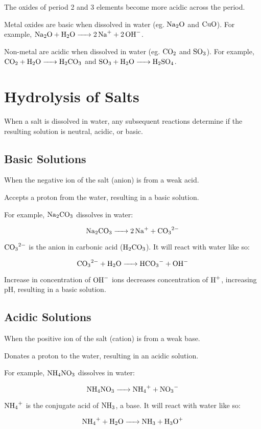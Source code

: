 \documentclass[a4paper,11pt]{article}
\begin{document}
The oxides of period 2 and 3 elements become more acidic across the period.

Metal oxides are basic when dissolved in water (eg. $\ce{Na2O}$ and $\ce{CuO}$).
For example, $\ce{Na2O + H2O -> 2Na+ + 2OH-}$.

Non-metal are acidic when dissolved in water (eg. $\ce{CO2}$ and $\ce{SO3}$).
For example, $\ce{CO2 + H2O -> H2CO3}$ and $\ce{SO3 + H2O -> H2SO4}$.


\section{Hydrolysis of Salts}

When a salt is dissolved in water, any subsequent reactions determine if the
resulting solution is neutral, acidic, or basic.


\subsection{Basic Solutions}

When the negative ion of the salt (anion) is from a weak acid.

Accepts a proton from the water, resulting in a basic solution.

For example, $\ce{Na2CO3}$ dissolves in water:

$$
\ce{Na2CO3 -> 2Na+ + CO3^2-}
$$

$\ce{CO3^2-}$ is the anion in carbonic acid ($\ce{H2CO3}$). It will react with
water like so:

$$
\ce{CO3^2- + H2O -> HCO3- + OH-}
$$

Increase in concentration of $\ce{OH-}$ ions decreases concentration of
$\ce{H+}$, increasing pH, resulting in a basic solution.


\subsection{Acidic Solutions}

When the positive ion of the salt (cation) is from a weak base.

Donates a proton to the water, resulting in an acidic solution.

For example, $\ce{NH4NO3}$ dissolves in water:

$$
\ce{NH4NO3 -> NH4+ + NO3-}
$$

$\ce{NH4+}$ is the conjugate acid of $\ce{NH3}$, a base. It will react with
water like so:

$$
\ce{NH4+ + H2O -> NH3 + H3O+}
$$
\end{document}
